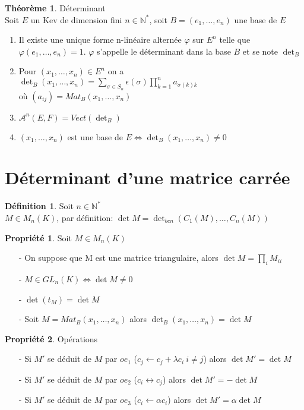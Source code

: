 \documentclass[fleqn]{article}
\theoremstyle{definition} \newtheorem*{defi}{D\'efinition}
\theoremstyle{definition} \newtheorem*{theo}{Th\'eor\`eme}
\theoremstyle{definition} \newtheorem*{coro}{Corollaire}
\theoremstyle{definition} \newtheorem*{nota}{Notation}
\theoremstyle{definition} \newtheorem*{vocab}{Vocabulaire}
\theoremstyle{remark} \newtheorem*{rqs}{Remarques}
\theoremstyle{definition} \newtheorem*{prop}{Propri\'et\'e}
\begin{document}
\begin{theo} D\'eterminant\\
	Soit $E$ un Kev de dimension fini $n \in \mathbb{N}^*$, soit $B = (e_1, \hdots, e_n)$ une base de $E$
	\begin{enumerate}
		\item Il existe une unique forme n-lin\'eaire altern\'ee $\varphi$ sur $E^n$ telle que \mbox{$\varphi(e_1, \hdots, e_n) = 1$}. $\varphi$
			s'appelle le d\'eterminant dans la base $B$ et se note $\det_B$
		\item Pour $(x_1, \hdots, x_n) \in E^n$ on a $\det_B(x_1, \hdots, x_n) = \sum_{\sigma \in S_n} \epsilon(\sigma) \prod_{k=1}^n
			a_{\sigma(k) k}$\\ o\`u $(a_{ij}) = Mat_B(x_1, \hdots, x_n)$
		\item $\mathscr{A}^n(E,F) = Vect(\det_B)$
		\item $(x_1, \hdots, x_n)$ est une base de $E \Leftrightarrow \det_B (x_1, \hdots, x_n) \neq 0$
	\end{enumerate}
\end{theo}

\section{D\'eterminant d'une matrice carr\'ee}
\begin{defi} Soit $n \in \mathbb{N}^*$\\
	$M \in M_n(K)$, par d\'efinition: $\det M = \det_{bcn} (C_1(M), \hdots, C_n(M))$
\end{defi}

\begin{prop} Soit $M \in M_n(K)$
	\begin{enumerate}
		\item [-] On suppose que M est une matrice triangulaire, alors $\det M = \prod_i M_{ii}$
		\item [-] $M \in GL_n(K) \Leftrightarrow \det M \neq 0$
		\item [-] $\det (t_M) = \det M$
		\item [-] Soit $M = Mat_B(x_1, \hdots, x_n)$ alors $\det_B (x_1, \hdots, x_n) = \det M$
	\end{enumerate}
\end{prop}

\begin{prop} Op\'erations
	\begin{enumerate}
		\item [-] Si $M'$ se d\'eduit de $M$ par $oe_1$ ($c_j \leftarrow c_j + \lambda c_i\ i \neq j$) alors $\det M' = \det M$
		\item [-] Si $M'$ se d\'eduit de $M$ par $oe_2$ ($c_i \leftrightarrow c_j$) alors $\det M' = -\det M$
		\item [-] Si $M'$ se d\'eduit de $M$ par $oe_3$ ($c_i \leftarrow \alpha c_i$) alors $\det M' = \alpha \det M$
	\end{enumerate}
\end{prop}
\end{document}
